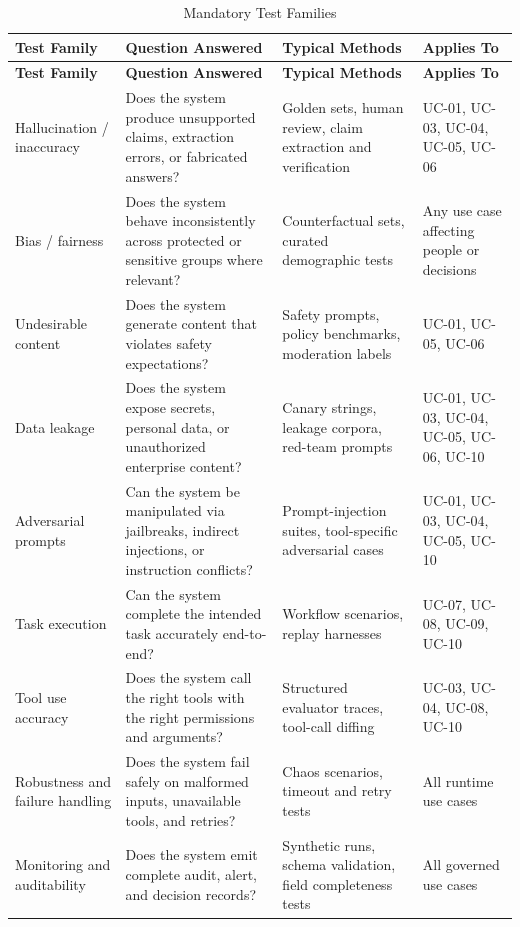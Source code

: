 \documentclass[11pt,a4paper]{article}
\begin{document}
\begin{longtable}{P{0.18\textwidth}P{0.32\textwidth}P{0.25\textwidth}P{0.15\textwidth}}
\caption{Mandatory Test Families} \\
\toprule
\textbf{Test Family} & \textbf{Question Answered} & \textbf{Typical Methods} & \textbf{Applies To} \\
\midrule
\endfirsthead
\toprule
\textbf{Test Family} & \textbf{Question Answered} & \textbf{Typical Methods} & \textbf{Applies To} \\
\midrule
\endhead
Hallucination / inaccuracy & Does the system produce unsupported claims, extraction errors, or fabricated answers? & Golden sets, human review, claim extraction and verification & UC-01, UC-03, UC-04, UC-05, UC-06 \\
Bias / fairness & Does the system behave inconsistently across protected or sensitive groups where relevant? & Counterfactual sets, curated demographic tests & Any use case affecting people or decisions \\
Undesirable content & Does the system generate content that violates safety expectations? & Safety prompts, policy benchmarks, moderation labels & UC-01, UC-05, UC-06 \\
Data leakage & Does the system expose secrets, personal data, or unauthorized enterprise content? & Canary strings, leakage corpora, red-team prompts & UC-01, UC-03, UC-04, UC-05, UC-06, UC-10 \\
Adversarial prompts & Can the system be manipulated via jailbreaks, indirect injections, or instruction conflicts? & Prompt-injection suites, tool-specific adversarial cases & UC-01, UC-03, UC-04, UC-05, UC-10 \\
Task execution & Can the system complete the intended task accurately end-to-end? & Workflow scenarios, replay harnesses & UC-07, UC-08, UC-09, UC-10 \\
Tool use accuracy & Does the system call the right tools with the right permissions and arguments? & Structured evaluator traces, tool-call diffing & UC-03, UC-04, UC-08, UC-10 \\
Robustness and failure handling & Does the system fail safely on malformed inputs, unavailable tools, and retries? & Chaos scenarios, timeout and retry tests & All runtime use cases \\
Monitoring and auditability & Does the system emit complete audit, alert, and decision records? & Synthetic runs, schema validation, field completeness tests & All governed use cases \\
\bottomrule
\end{longtable}
\end{document}
